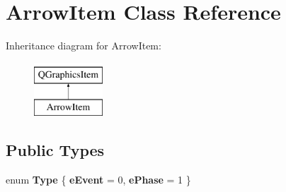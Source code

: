 \hypertarget{class_arrow_item}{\section{Arrow\-Item Class Reference}
\label{class_arrow_item}
}
Inheritance diagram for Arrow\-Item\-:\begin{figure}[H]
\begin{center}
\leavevmode
\includegraphics[height=2.000000cm]{class_arrow_item}
\end{center}
\end{figure}
\subsection*{Public Types}
\begin{DoxyCompactItemize}
\item 
enum {\bfseries Type} \{ {\bfseries e\-Event} = 0, 
{\bfseries e\-Phase} = 1
 \}
\end{DoxyCompactItemize}
